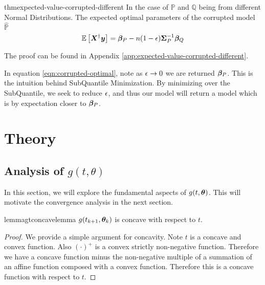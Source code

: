 \documentclass{article} %
\begin{document}
	\begin{restatable}{thm}{expected-value-corrupted-different}\label{thm:expected-value-corrupted-different}
		In the case of $\mathbb{P}$ and $\mathbb{Q}$ being from different Normal Distributions. The expected optimal parameters of the corrupted model $\hat{\mathbb{P}}$\vspace{1em}
		\begin{equation}
			\mathbb{E}\left[{\bm{X}}^{\dagger}{\bm{y}} \right] = {\bm{\beta}}_P - n(1-{\epsilon}){\bm{\Sigma}}_P^{-1}{\bm{\beta}}_Q
		\end{equation}
	\end{restatable}
	The proof can be found in Appendix \ref{app:expected-value-corrupted-different}.
	
	In equation \ref{eqn:corrupted-optimal}, note as $\displaystyle {\epsilon} \to 0$ we are returned ${\bm{\beta}}_P$. This is the intuition behind SubQuantile Minimization. By minimizing over the SubQuantile, we seek to reduce ${\epsilon}$, and thus our model will return a model which is by expectation closer to ${\bm{\beta}}_P$. 	

	\section{Theory} 
	
	\subsection{Analysis of $g(t,\theta)$}
	
	In this section, we will explore the fundamental aspects of $g(t,{\bm{\theta}})$. This will motivate the convergence analysis in the next section.
	
	\begin{restatable}{lemma}{gtconcavelemma}
		\label{lem:gtcomcavelemma}
		$g(t_{k+1},{\bm{\theta}}_k)$ is concave with respect to $t$.
	\end{restatable}
	\begin{proof}
		We provide a simple argument for concavity. Note $t$ is a concave and convex function. Also $(\cdot)^+$ is a convex strictly non-negative function. Therefore we have a concave function minus the non-negative multiple of a summation of an affine function composed with a convex function. Therefore this is a concave function with respect to $t$. 
	\end{proof}	
	
\end{document}

